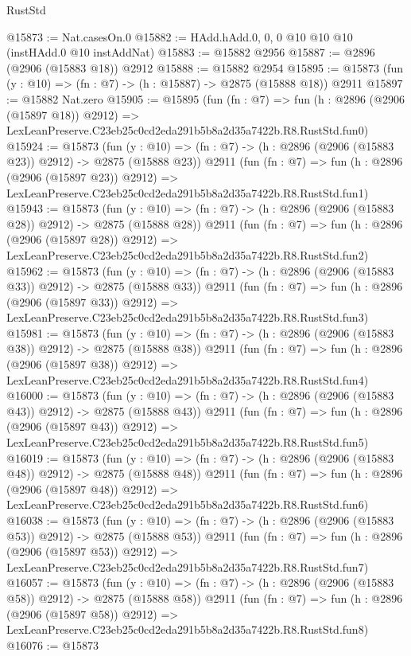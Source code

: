 \begin{lexlean}{RustStd}
\begin{coremodule}
@15873 := Nat.casesOn.{0}
@15882 := HAdd.hAdd.{0, 0, 0} @10 @10 @10 (instHAdd.{0} @10 instAddNat)
@15883 := @15882 @2956
@15887 := @2896 (@2906 (@15883 @18)) @2912
@15888 := @15882 @2954
@15895 := @15873 (fun (y : @10) => (fn : @7) -> (h : @15887) -> @2875 (@15888 @18)) @2911
@15897 := @15882 Nat.zero
@15905 := @15895
    (fun (fn : @7) =>
    fun (h : @2896 (@2906 (@15897 @18)) @2912) =>
    LexLeanPreserve.C23eb25c0cd2eda291b5b8a2d35a7422b.R8.RustStd.fun0)
@15924 := @15873
    (fun (y : @10) => (fn : @7) -> (h : @2896 (@2906 (@15883 @23)) @2912) -> @2875 (@15888 @23))
    @2911
    (fun (fn : @7) =>
    fun (h : @2896 (@2906 (@15897 @23)) @2912) =>
    LexLeanPreserve.C23eb25c0cd2eda291b5b8a2d35a7422b.R8.RustStd.fun1)
@15943 := @15873
    (fun (y : @10) => (fn : @7) -> (h : @2896 (@2906 (@15883 @28)) @2912) -> @2875 (@15888 @28))
    @2911
    (fun (fn : @7) =>
    fun (h : @2896 (@2906 (@15897 @28)) @2912) =>
    LexLeanPreserve.C23eb25c0cd2eda291b5b8a2d35a7422b.R8.RustStd.fun2)
@15962 := @15873
    (fun (y : @10) => (fn : @7) -> (h : @2896 (@2906 (@15883 @33)) @2912) -> @2875 (@15888 @33))
    @2911
    (fun (fn : @7) =>
    fun (h : @2896 (@2906 (@15897 @33)) @2912) =>
    LexLeanPreserve.C23eb25c0cd2eda291b5b8a2d35a7422b.R8.RustStd.fun3)
@15981 := @15873
    (fun (y : @10) => (fn : @7) -> (h : @2896 (@2906 (@15883 @38)) @2912) -> @2875 (@15888 @38))
    @2911
    (fun (fn : @7) =>
    fun (h : @2896 (@2906 (@15897 @38)) @2912) =>
    LexLeanPreserve.C23eb25c0cd2eda291b5b8a2d35a7422b.R8.RustStd.fun4)
@16000 := @15873
    (fun (y : @10) => (fn : @7) -> (h : @2896 (@2906 (@15883 @43)) @2912) -> @2875 (@15888 @43))
    @2911
    (fun (fn : @7) =>
    fun (h : @2896 (@2906 (@15897 @43)) @2912) =>
    LexLeanPreserve.C23eb25c0cd2eda291b5b8a2d35a7422b.R8.RustStd.fun5)
@16019 := @15873
    (fun (y : @10) => (fn : @7) -> (h : @2896 (@2906 (@15883 @48)) @2912) -> @2875 (@15888 @48))
    @2911
    (fun (fn : @7) =>
    fun (h : @2896 (@2906 (@15897 @48)) @2912) =>
    LexLeanPreserve.C23eb25c0cd2eda291b5b8a2d35a7422b.R8.RustStd.fun6)
@16038 := @15873
    (fun (y : @10) => (fn : @7) -> (h : @2896 (@2906 (@15883 @53)) @2912) -> @2875 (@15888 @53))
    @2911
    (fun (fn : @7) =>
    fun (h : @2896 (@2906 (@15897 @53)) @2912) =>
    LexLeanPreserve.C23eb25c0cd2eda291b5b8a2d35a7422b.R8.RustStd.fun7)
@16057 := @15873
    (fun (y : @10) => (fn : @7) -> (h : @2896 (@2906 (@15883 @58)) @2912) -> @2875 (@15888 @58))
    @2911
    (fun (fn : @7) =>
    fun (h : @2896 (@2906 (@15897 @58)) @2912) =>
    LexLeanPreserve.C23eb25c0cd2eda291b5b8a2d35a7422b.R8.RustStd.fun8)
@16076 := @15873

\end{coremodule}
\end{lexlean}
